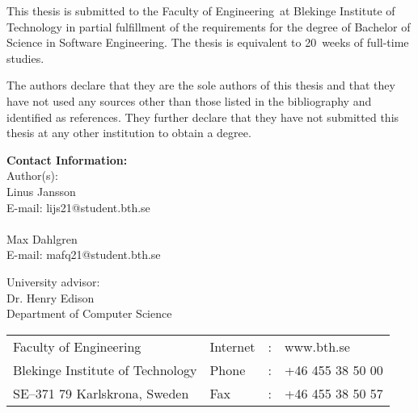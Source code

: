 \documentclass[a4paper,twoside]{bth}
\makeatletter
\newcommand{\thesisDegree}{Bachelor of Science in Software Engineering}
\newcommand{\faculty}{Engineering}
\newcommand{\thesisWeeks}{20}
\newcommand{\authorFirst}{Linus Jansson}
\newcommand{\authorFirstMail}{lijs21@student.bth.se}
\newcommand{\authorSecond}{Max Dahlgren}
\newcommand{\authorSecondMail}{mafq21@student.bth.se}
\newcommand{\super}{Dr. Henry Edison}
\newcommand{\superAffiliation}{Computer Science}
\makeatother
\begin{document}
{\pagestyle{empty}
\changepage{3cm}{1cm}{-0.5cm}{-0.5cm}{}{-1.5cm}{}{}{}

{\small
\noindent
This thesis is submitted to the Faculty of \faculty\ at Blekinge Institute
of Technology in partial fulfillment of the requirements for the degree of
\thesisDegree. The thesis is equivalent to \thesisWeeks\ weeks of full-time studies.

\vspace{1cm}

\noindent
The authors declare that they are the sole authors of this thesis and that they have
not used any sources other than those listed in the bibliography and identified as references.
They further declare that they have not submitted this thesis at any other institution to
obtain a degree.
}

\vspace{10cm}

\noindent
\textbf{Contact Information:} \\
Author(s): \\
\authorFirst \\
E-mail: \authorFirstMail \\
\\
\authorSecond \\
E-mail: \authorSecondMail

\vspace{2cm}

\noindent
University advisor: \\
\super \\
Department of \superAffiliation

\vspace*{\fill}

\noindent
\begin{tabular}{@{}p{} l c l}
Faculty of \faculty              & Internet & : & www.bth.se \\
Blekinge Institute of Technology & Phone    & : & +46 455 38 50 00 \\
SE--371 79 Karlskrona, Sweden    & Fax      & : & +46 455 38 50 57 \\
\end{tabular}
\clearpage
} %

\setcounter{page}{1}


\end{document}
